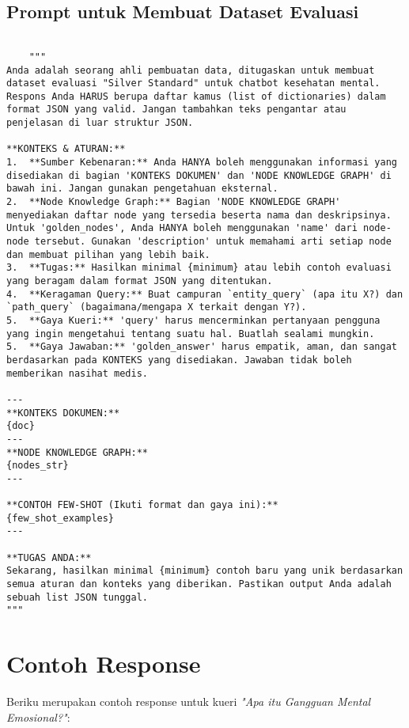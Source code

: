 \subsection{Prompt untuk Membuat Dataset Evaluasi}
\begin{lstlisting}[numbers=none]

	"""
Anda adalah seorang ahli pembuatan data, ditugaskan untuk membuat dataset evaluasi "Silver Standard" untuk chatbot kesehatan mental.
Respons Anda HARUS berupa daftar kamus (list of dictionaries) dalam format JSON yang valid. Jangan tambahkan teks pengantar atau penjelasan di luar struktur JSON.

**KONTEKS & ATURAN:**
1.  **Sumber Kebenaran:** Anda HANYA boleh menggunakan informasi yang disediakan di bagian 'KONTEKS DOKUMEN' dan 'NODE KNOWLEDGE GRAPH' di bawah ini. Jangan gunakan pengetahuan eksternal.
2.  **Node Knowledge Graph:** Bagian 'NODE KNOWLEDGE GRAPH' menyediakan daftar node yang tersedia beserta nama dan deskripsinya. Untuk 'golden_nodes', Anda HANYA boleh menggunakan 'name' dari node-node tersebut. Gunakan 'description' untuk memahami arti setiap node dan membuat pilihan yang lebih baik.
3.  **Tugas:** Hasilkan minimal {minimum} atau lebih contoh evaluasi yang beragam dalam format JSON yang ditentukan.
4.  **Keragaman Query:** Buat campuran `entity_query` (apa itu X?) dan `path_query` (bagaimana/mengapa X terkait dengan Y?).
5.  **Gaya Kueri:** 'query' harus mencerminkan pertanyaan pengguna yang ingin mengetahui tentang suatu hal. Buatlah sealami mungkin.
5.  **Gaya Jawaban:** 'golden_answer' harus empatik, aman, dan sangat berdasarkan pada KONTEKS yang disediakan. Jawaban tidak boleh memberikan nasihat medis.

---
**KONTEKS DOKUMEN:**
{doc}
---
**NODE KNOWLEDGE GRAPH:**
{nodes_str}
---

**CONTOH FEW-SHOT (Ikuti format dan gaya ini):**
{few_shot_examples}
---

**TUGAS ANDA:**
Sekarang, hasilkan minimal {minimum} contoh baru yang unik berdasarkan semua aturan dan konteks yang diberikan. Pastikan output Anda adalah sebuah list JSON tunggal.
"""
\end{lstlisting}

\vspace{18cm}
\section{Contoh Response}
Beriku merupakan contoh response untuk kueri \textit{"Apa itu Gangguan Mental Emosional?"}:

